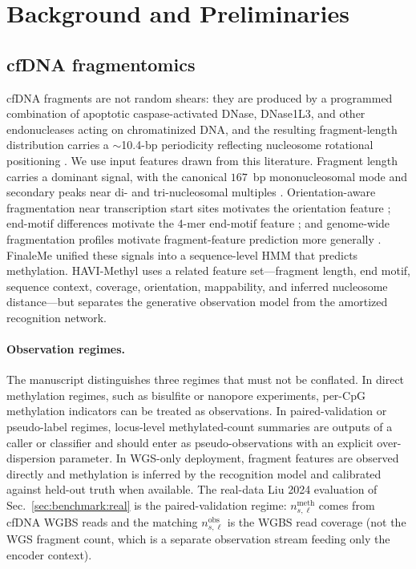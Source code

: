 \section{Background and Preliminaries}
\label{sec:background}

\subsection{cfDNA fragmentomics}
cfDNA fragments are not random shears: they are produced by a programmed combination of apoptotic caspase-activated DNase, DNase1L3, and other endonucleases acting on chromatinized DNA, and the resulting fragment-length distribution carries a $\sim$10.4-bp periodicity reflecting nucleosome rotational positioning \citep{snyder2016,jiang2020}. We use input features drawn from this literature. Fragment length carries a dominant signal, with the canonical $167$~bp mononucleosomal mode and secondary peaks near di- and tri-nucleosomal multiples \citep{snyder2016}. Orientation-aware fragmentation near transcription start sites motivates the orientation feature \citep{sun2019orientationaware}; end-motif differences motivate the 4-mer end-motif feature \citep{zhou2022}; and genome-wide fragmentation profiles motivate fragment-feature prediction more generally \citep{cristiano2019delfi}. FinaleMe \citep{liu2024finaleme} unified these signals into a sequence-level HMM that predicts methylation. HAVI-Methyl uses a related feature set---fragment length, end motif, sequence context, coverage, orientation, mappability, and inferred nucleosome distance---but separates the generative observation model from the amortized recognition network.

\paragraph{Observation regimes.} The manuscript distinguishes three regimes that must not be conflated. In direct methylation regimes, such as bisulfite or nanopore experiments, per-CpG methylation indicators can be treated as observations. In paired-validation or pseudo-label regimes, locus-level methylated-count summaries are outputs of a caller or classifier and should enter as pseudo-observations with an explicit over-dispersion parameter. In WGS-only deployment, fragment features are observed directly and methylation is inferred by the recognition model and calibrated against held-out truth when available. The real-data Liu 2024 evaluation of Sec.~\ref{sec:benchmark:real} is the paired-validation regime: ${n}_{s,\ell}^{\mathrm{meth}}$ comes from cfDNA WGBS reads and the matching ${n}_{s,\ell}^{\mathrm{obs}}$ is the WGBS read coverage (not the WGS fragment count, which is a separate observation stream feeding only the encoder context).

